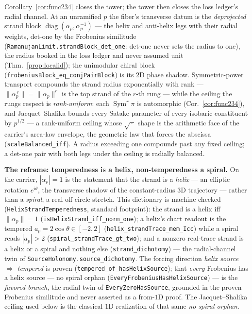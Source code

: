 \documentclass[11pt]{article}
\theoremstyle{definition}
\newcommand{\Sym}{\operatorname{Sym}}
\begin{document}
Corollary~\ref{cor:func234} closes the tower; the tower then closes the loss ledger's radial
channel. At an unramified $p$ the fiber's transverse datum is the \emph{deprojected} strand block
$\operatorname{diag}(\alpha_p,\alpha_p^{-1})$ --- the helix and anti-helix legs with their radial
weights, det-one by the Frobenius similitude (\texttt{RamanujanLimit.strandBlock\_det\_one}:
det-one never sets the radius to one), the radius booked in the loss ledger and never assumed
unit (Thm.~\ref{prop:localid}); the unimodular chiral block
(\texttt{frobeniusBlock\_eq\_conjPairBlock}) is its $2$D phase shadow. Symmetric-power transport
compounds the strand radius exponentially with rank --- $\|\alpha_p^{\,r}\|=\|\alpha_p\|^{r}$ is
the top strand of the $r$-th rung --- while the ceiling the rungs respect is \emph{rank-uniform}:
each $\Sym^r\pi$ is automorphic (Cor.~\ref{cor:func234}), and Jacquet--Shalika \cite{JS} bounds
every Satake parameter of every isobaric constituent by $p^{1/2}$ --- a rank-uniform ceiling whose
$\sqrt{\,\cdot\,}$ shape is the arithmetic face of the carrier's area-law envelope, the geometric
law that forces the abscissa (\texttt{scaleBalanced\_iff}). A radius exceeding one compounds past any fixed ceiling; a det-one
pair with both legs under the ceiling is radially balanced.

\medskip\noindent\textbf{The reframe: temperedness is a helix, non-temperedness a spiral.}  On the
carrier, $|\alpha_p|=1$ is the statement that the strand is a \emph{helix} --- an elliptic rotation
$e^{i\theta}$, the transverse shadow of the constant-radius $3$D trajectory --- rather than a
\emph{spiral}, a real off-circle stretch.  This dictionary is machine-checked
(\texttt{HelixStrandTemperedness}, standard footprint): the strand is a helix iff $\|\alpha_p\|=1$
(\texttt{isHelixStrand\_iff\_norm\_one}); a helix's chart readout is the tempered
$a_p=2\cos\theta\in[-2,2]$ (\texttt{helix\_strandTrace\_mem\_Icc}) while a spiral reads $|a_p|>2$
(\texttt{spiral\_strandTrace\_gt\_two}); and a nonzero real-trace strand is a helix or a spiral and
nothing else (\texttt{strand\_dichotomy}) --- the radial-channel twin of
\texttt{SourceHolonomy.source\_dichotomy}.  The forcing direction \emph{helix source $\Rightarrow$
tempered} is proven (\texttt{tempered\_of\_hasHelixSource}); that \emph{every} Frobenius has a helix
source --- no spiral orphan (\texttt{EveryFrobeniusHasHelixSource}) --- is the \emph{favored branch},
the radial twin of \texttt{EveryZeroHasSource}, grounded in the proven Frobenius similitude and never
asserted as a from-$1$D proof.  The Jacquet--Shalika ceiling used below is the classical $1$D
realization of that same \emph{no spiral orphan}.
\end{document}
